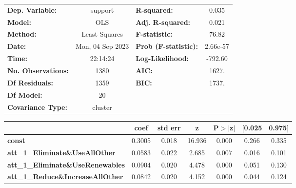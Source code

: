 \begin{center}
\begin{tabular}{lclc}
\toprule
\textbf{Dep. Variable:}                     &     support      & \textbf{  R-squared:         } &     0.035   \\
\textbf{Model:}                             &       OLS        & \textbf{  Adj. R-squared:    } &     0.021   \\
\textbf{Method:}                            &  Least Squares   & \textbf{  F-statistic:       } &     76.82   \\
\textbf{Date:}                              & Mon, 04 Sep 2023 & \textbf{  Prob (F-statistic):} &  2.66e-57   \\
\textbf{Time:}                              &     22:14:24     & \textbf{  Log-Likelihood:    } &   -792.60   \\
\textbf{No. Observations:}                  &        1380      & \textbf{  AIC:               } &     1627.   \\
\textbf{Df Residuals:}                      &        1359      & \textbf{  BIC:               } &     1737.   \\
\textbf{Df Model:}                          &          20      & \textbf{                     } &             \\
\textbf{Covariance Type:}                   &     cluster      & \textbf{                     } &             \\
\bottomrule
\end{tabular}
\begin{tabular}{lcccccc}
                                            & \textbf{coef} & \textbf{std err} & \textbf{z} & \textbf{P$> |$z$|$} & \textbf{[0.025} & \textbf{0.975]}  \\
\midrule
\textbf{const}                              &       0.3005  &        0.018     &    16.936  &         0.000        &        0.266    &        0.335     \\
\textbf{att\_1\_Eliminate\&UseAllOther}     &       0.0583  &        0.022     &     2.685  &         0.007        &        0.016    &        0.101     \\
\textbf{att\_1\_Eliminate\&UseRenewables}   &       0.0904  &        0.020     &     4.478  &         0.000        &        0.051    &        0.130     \\
\textbf{att\_1\_Reduce\&IncreaseAllOther}   &       0.0842  &        0.020     &     4.152  &         0.000        &        0.044    &        0.124     \\

\end{tabular}
\end{center}
